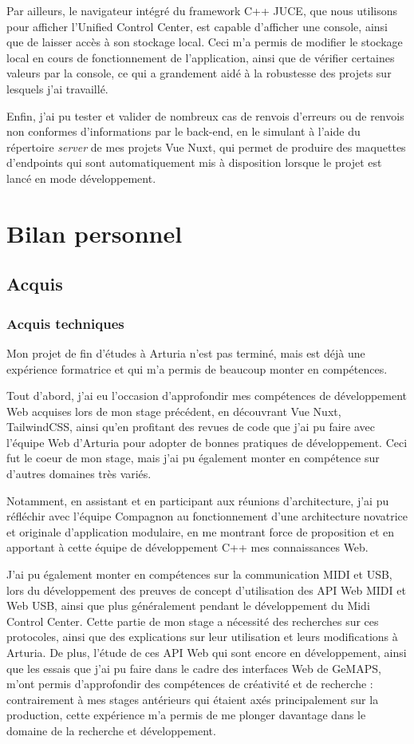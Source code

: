 \documentclass[francais]{rapportPFE}  %
\begin{document}
Par ailleurs, le navigateur intégré du framework C++ JUCE, que nous utilisons pour afficher l'Unified Control Center, est capable d'afficher une console, ainsi que de laisser accès à son stockage local. Ceci m'a permis de modifier le stockage local en cours de fonctionnement de l'application, ainsi que de vérifier certaines valeurs par la console, ce qui a grandement aidé à la robustesse des projets sur lesquels j'ai travaillé.

Enfin, j'ai pu tester et valider de nombreux cas de renvois d'erreurs ou de renvois non conformes d'informations par le back-end, en le simulant à l'aide du répertoire \textit{server} de mes projets Vue Nuxt, qui permet de produire des maquettes d'endpoints qui sont automatiquement mis à disposition lorsque le projet est lancé en mode développement.

\section{Bilan personnel}
\subsection{Acquis}
\subsubsection{Acquis techniques}

Mon projet de fin d'études à Arturia n'est pas terminé, mais est déjà une expérience formatrice et qui m'a permis de beaucoup monter en compétences. 

Tout d'abord, j'ai eu l'occasion d'approfondir mes compétences de développement Web acquises lors de mon stage précédent, en découvrant Vue Nuxt, TailwindCSS, ainsi qu'en profitant des revues de code que j'ai pu faire avec l'équipe Web d'Arturia pour adopter de bonnes pratiques de développement. Ceci fut le coeur de mon stage, mais j'ai pu également monter en compétence sur d'autres domaines très variés. 

Notamment, en assistant et en participant aux réunions d'architecture, j'ai pu réfléchir avec l'équipe Compagnon au fonctionnement d'une architecture novatrice et originale d'application modulaire, en me montrant force de proposition et en apportant à cette équipe de développement C++ mes connaissances Web. 

J'ai pu également monter en compétences sur la communication MIDI et USB, lors du développement des preuves de concept d'utilisation des API Web MIDI et Web USB, ainsi que plus généralement pendant le développement du Midi Control Center. Cette partie de mon stage a nécessité des recherches sur ces protocoles, ainsi que des explications sur leur utilisation et leurs modifications à Arturia. 
De plus, l'étude de ces API Web qui sont encore en développement, ainsi que les essais que j'ai pu faire dans le cadre des interfaces Web de GeMAPS, m'ont permis d'approfondir des compétences de créativité et de recherche : contrairement à mes stages antérieurs qui étaient axés principalement sur la production, cette expérience m'a permis de me plonger davantage dans le domaine de la recherche et développement.
\end{document}
